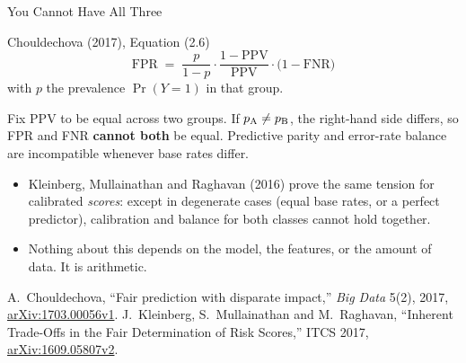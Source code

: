 
\begin{frame}[allowframebreaks]{You Cannot Have All Three}

    \begin{block}{Chouldechova (2017), Equation (2.6)}
        \[
            \text{FPR} \;=\; \frac{p}{1-p}\cdot\frac{1-\text{PPV}}{\text{PPV}}\cdot\bigl(1-\text{FNR}\bigr)
        \]
        with $p$ the prevalence $\Pr(Y=1)$ in that group.
    \end{block}

    \vspace{0.6em}

    Fix PPV to be equal across two groups. If $p_{\text{A}} \neq p_{\text{B}}$, the right-hand side differs,
    so FPR and FNR \textbf{cannot both} be equal. Predictive parity and error-rate balance are
    incompatible whenever base rates differ.

    \vspace{0.8em}

    \begin{itemize}\small
        \setlength\itemsep{0.35em}
        \item Kleinberg, Mullainathan and Raghavan (2016) prove the same tension for calibrated
              \emph{scores}: except in degenerate cases (equal base rates, or a perfect predictor),
              calibration and balance for both classes cannot hold together.
        \item Nothing about this depends on the model, the features, or the amount of data. It is
              arithmetic.
    \end{itemize}

    \vspace{0.3em}
    {\scriptsize A.~Chouldechova, ``Fair prediction with disparate impact,'' \emph{Big Data} 5(2), 2017,
    \href{https://arxiv.org/abs/1703.00056v1}{arXiv:1703.00056v1}. J.~Kleinberg, S.~Mullainathan and
    M.~Raghavan, ``Inherent Trade-Offs in the Fair Determination of Risk Scores,'' ITCS 2017,
    \href{https://arxiv.org/abs/1609.05807v2}{arXiv:1609.05807v2}.}
\end{frame}
